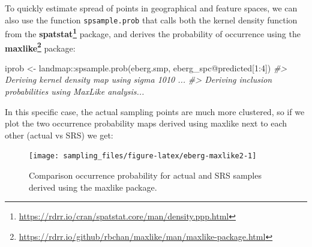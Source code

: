 \documentclass[
  graybox,natbib,nospthms]{svmono}
\newenvironment{Shaded}{\begin{snugshade}}{\end{snugshade}}
\newcommand{\AttributeTok}[1]{\textcolor[rgb]{0.61,0.61,0.61}{#1}}
\newcommand{\CommentTok}[1]{\textcolor[rgb]{0.37,0.37,0.37}{\textit{#1}}}
\newcommand{\DecValTok}[1]{\textcolor[rgb]{0.06,0.06,0.06}{#1}}
\newcommand{\FunctionTok}[1]{\textcolor[rgb]{0,0,0}{#1}}
\newcommand{\NormalTok}[1]{#1}
\newcommand{\OtherTok}[1]{\textcolor[rgb]{0.37,0.37,0.37}{#1}}
\newcommand{\SpecialCharTok}[1]{\textcolor[rgb]{0,0,0}{#1}}
\newcommand{\StringTok}[1]{\textcolor[rgb]{0.5,0.5,0.5}{#1}}
\renewcommand{\href}[2]{#2 (\url{#1})}
\renewcommand{\href}[2]{#2\footnote{\url{#1}}}
\begin{document}
To quickly estimate spread of points in geographical and feature spaces, we can
also use the function \texttt{spsample.prob} that calls both the kernel density function
from the \textbf{\href{https://rdrr.io/cran/spatstat.core/man/density.ppp.html}{spatstat}} package, and derives the probability of occurrence using the
\textbf{\href{https://rdrr.io/github/rbchan/maxlike/man/maxlike-package.html}{maxlike}} package:

\begin{Shaded}
\begin{Highlighting}[]
\NormalTok{iprob }\OtherTok{\textless{}{-}}\NormalTok{ landmap}\SpecialCharTok{::}\FunctionTok{spsample.prob}\NormalTok{(eberg.smp, eberg\_spc}\SpecialCharTok{@}\NormalTok{predicted[}\DecValTok{1}\SpecialCharTok{:}\DecValTok{4}\NormalTok{])}
\CommentTok{\#\textgreater{} Deriving kernel density map using sigma 1010 ...}
\CommentTok{\#\textgreater{} Deriving inclusion probabilities using MaxLike analysis...}
\end{Highlighting}
\end{Shaded}

In this specific case, the actual sampling points are much more clustered, so if we plot
the two occurrence probability maps derived using maxlike next to each other (actual vs SRS) we get:

\begin{Shaded}
\end{Shaded}

\begin{figure}

{\centering \texttt{[image: sampling\_files/figure-latex/eberg-maxlike2-1]} 

}

\caption{Comparison occurrence probability for actual and SRS samples derived using the maxlike package.}\label{fig:eberg-maxlike2}
\end{figure}
\end{document}
